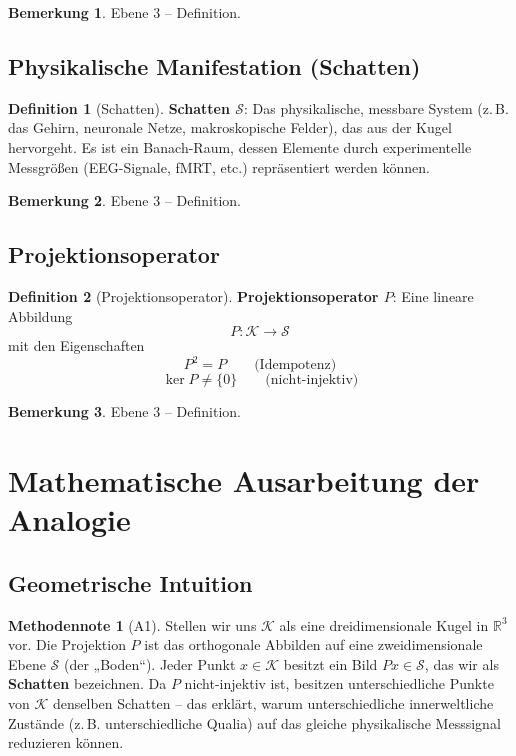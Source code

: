 \documentclass[11pt,a4paper]{article}
\theoremstyle{definition}
\newtheorem{remark}{Bemerkung}[section]
\newtheorem{methodennote}{Methodennote}[section]
\newtheorem{definition}{Definition}[section]
\theoremstyle{plain}
\begin{document}
\begin{remark}
Ebene 3 – Definition.
\end{remark}

\subsection{Physikalische Manifestation (Schatten)}
\begin{definition}[Schatten]
\textbf{Schatten $\mathcal{S}$}: Das physikalische, messbare
System (z.\,B. das Gehirn, neuronale Netze, makroskopische Felder),
das aus der Kugel hervorgeht. Es ist ein Banach-Raum, dessen Elemente
durch experimentelle Messgrößen (EEG-Signale, fMRT, etc.) repräsentiert
werden können.
\end{definition}

\begin{remark}
Ebene 3 – Definition.
\end{remark}

\subsection{Projektionsoperator}
\begin{definition}[Projektionsoperator]
\textbf{Projektionsoperator $P$}: Eine lineare Abbildung
\[
   P\colon\mathcal{K}\longrightarrow\mathcal{S}
\]
mit den Eigenschaften
\[
   P^{2}=P\qquad\text{(Idempotenz)}\tag{1}
\]
\[
   \ker P\neq\{0\}\qquad\text{(nicht-injektiv)}\tag{2}
\]
\end{definition}

\begin{remark}
Ebene 3 – Definition.
\end{remark}

\section{Mathematische Ausarbeitung der Analogie}

\subsection{Geometrische Intuition}
\begin{methodennote}[A1]
Stellen wir uns $\mathcal{K}$ als eine dreidimensionale Kugel in
$\mathbb{R}^{3}$ vor. Die Projektion $P$ ist das orthogonale
Abbilden auf eine zweidimensionale Ebene $\mathcal{S}$ (der „Boden“). Jeder
Punkt $x\in\mathcal{K}$ besitzt ein Bild $Px\in\mathcal{S}$, das wir als
\textbf{Schatten} bezeichnen. Da $P$ nicht-injektiv ist, besitzen
unterschiedliche Punkte von $\mathcal{K}$ denselben Schatten – das erklärt,
warum unterschiedliche innerweltliche Zustände (z.\,B. unterschiedliche Qualia)
auf das gleiche physikalische Messsignal reduzieren können.
\end{methodennote}
\end{document}
